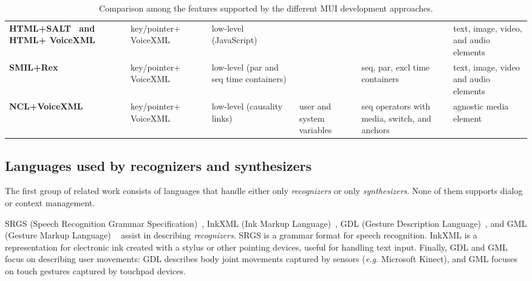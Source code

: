 \documentclass[
  doutorado,
  american
]{ThesisPUC}
\begin{document}
\begin{landscape}
\begin{table}
\begin{tabular}[]{ m{4cm}|m{3cm} m{3cm} m{3cm} m{3cm} m{3cm} m{3cm}}
	\hline
	\rowcolor[HTML]{F2F2F2} \multicolumn{7}{c}{Multimedia languages}\\
	\hline
	
	\textbf{HTML+SALT~\cite{wang_salt:_2002} and HTML+ VoiceXML~\cite{w3c_xhtml+voice_2001}} & key/pointer+ 
	VoiceXML & &  
	low-level (JavaScript) & & & text, image, video, and audio elements\\
	\textbf{SMIL+Rex~\cite{beckham_towards_2001}} & key/pointer+ VoiceXML & & low-level (par and seq 
	time 
	containers) & & seq, par, excl time containers & text, image, video and 
	audio elements\\
	\textbf{NCL+VoiceXML~\cite{carvalho_estendendo_2010}} & key/pointer+ VoiceXML & & low-level (causality 
	links) & user and system variables & seq operators with media, switch, and 
	anchors & agnostic media element\\
	\hline
	
\end{tabular}
\caption{Comparison among the features supported by the different MUI 
development approaches.}
\label{table:state}
\end{table}
\end{landscape}

\subsection{Languages used by recognizers and synthesizers}
\label{sec:state:monomodal}

The first group of related work consists of languages that handle either only 
\textit{recognizers} or only \textit{synthesizers}. None of them supports dialog
or context management.

SRGS (Speech Recognition Grammar Specification)~\cite{andrew_hunt_speech_2004},
InkXML (Ink Markup Language)~\cite{w3c_ink_2011}, GDL (Gesture Description
Language)~\cite{hachaj_semantic_2012}, and GML (Gesture Markup Language)
~\cite{ideum_inc_gesture_2016} assist in describing \textit{recognizers}. SRGS
is a grammar format for speech recognition. InkXML is a representation for
electronic ink created with a stylus or other pointing devices, useful for
handling text input. Finally, GDL and GML focus on describing user movements:
GDL describes body joint movements captured by sensors (\textit{e.g.} Microsoft Kinect),
and GML focuses on touch gestures captured by touchpad devices.
\end{document}
